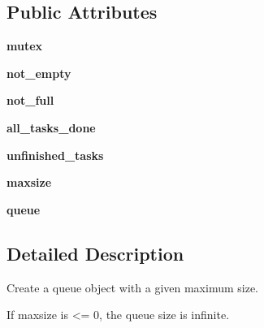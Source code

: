\subsection*{Public Attributes}
\begin{DoxyCompactItemize}
\item 
\mbox{\label{classpygame_1_1threads_1_1_py25_queue_1_1_queue_a2fab0d22bfa9a021ecc13eadf3ffd5cc}} 
{\bfseries mutex}
\item 
\mbox{\label{classpygame_1_1threads_1_1_py25_queue_1_1_queue_a5312c45b4c8cc986689ce9229a977e41}} 
{\bfseries not\+\_\+empty}
\item 
\mbox{\label{classpygame_1_1threads_1_1_py25_queue_1_1_queue_a7ddd861e5124b85eee5d1b6a55738591}} 
{\bfseries not\+\_\+full}
\item 
\mbox{\label{classpygame_1_1threads_1_1_py25_queue_1_1_queue_a839bb0382b2fd4a6cc4087fea05d4cd2}} 
{\bfseries all\+\_\+tasks\+\_\+done}
\item 
\mbox{\label{classpygame_1_1threads_1_1_py25_queue_1_1_queue_a92cb4062d73b33cb5928c5d70f3cc209}} 
{\bfseries unfinished\+\_\+tasks}
\item 
\mbox{\label{classpygame_1_1threads_1_1_py25_queue_1_1_queue_a68669d375bd85f56fbc13044db2c5a29}} 
{\bfseries maxsize}
\item 
\mbox{\label{classpygame_1_1threads_1_1_py25_queue_1_1_queue_ad6f8704920b805f306e41e2af035abe6}} 
{\bfseries queue}
\end{DoxyCompactItemize}


\subsection{Detailed Description}
\begin{DoxyVerb}Create a queue object with a given maximum size.

If maxsize is <= 0, the queue size is infinite.
\end{DoxyVerb}
 

